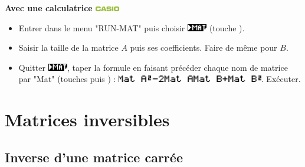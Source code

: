 \documentclass{cornouaille}
\newcommand{\touchecalc}[1]{\fbox{#1}}
\begin{document}
\begin{methode}
\textcolor{H1}{\bfseries Avec une calculatrice \includegraphics[height=2mm]{CASIO_logo.eps}}
\begin{itemize}
\item Entrer dans le menu "RUN-MAT" puis choisir \includegraphics[height=3mm]{CASIO_MAT.eps} (touche \touchecalc{F3}).
\item Saisir la taille de la matrice $A$ puis ses coefficients. Faire de même pour $B$.
\item Quitter \includegraphics[height=3mm]{CASIO_MAT.eps}, taper la formule en faisant précéder chaque nom de matrice par "Mat" (touches \touchecalc{SHIFT} puis \touchecalc{2}) : \includegraphics[height=3mm]{CASIO_screenshot2.eps}. Exécuter.
\begin{center}
    \hspace{.5cm} 
   \end{center}
\end{itemize}

\end{methode}


\section{Matrices inversibles}

\subsection{Inverse d'une matrice carrée}
\end{document}
